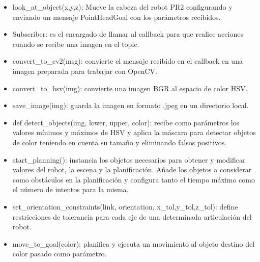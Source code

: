 \documentclass[12pt,spanish,chapterprefix, numbers=noenddot]{book}
\numberwithin{equation}{section}
\numberwithin{figure}{section}
\begin{document}
\begin{itemize}
\item look\_at\_object(x,y,z): Mueve la cabeza del robot PR2 configurando y enviando un mensaje PointHeadGoal con los parámetros recibidos.
\item Subscriber: es el encargado de llamar al callback para que realice acciones cuando se recibe una imagen en el topic.
\item convert\_to\_cv2(msg): convierte el mensaje recibido en el callback en una imagen preparada para trabajar con OpenCV.
\item convert\_to\_hsv(img): convierte una imagen BGR al espacio de color HSV. 
\item save\_image(img): guarda la imagen en formato .jpeg en un directorio local. 
\item def detect\_objects(img, lower, upper, color): recibe como parámetros los valores mínimos y máximos de HSV y aplica la máscara para detectar objetos de color teniendo en cuenta su tamaño y eliminando falsos positivos. 
\item start\_planning(): instancia los objetos necesarios para obtener y modificar valores del robot, la escena y la planificación. Añade los objetos a considerar como obstáculos en la planificación y configura tanto el tiempo máximo como el número de intentos para la misma. 
\item set\_orientation\_constraints(link, orientation, x\_tol,y\_tol,z\_tol): define restricciones de tolerancia para cada eje de una determinada articulación del robot. 
\item move\_to\_goal(color): planifica y ejecuta un movimiento al objeto destino del color pasado como parámetro. 
\end{itemize}
\end{document}
